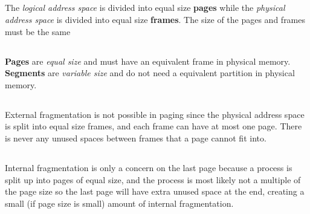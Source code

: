 \documentclass[11pt,letterpaper]{article}
\begin{document}
		\subsection{}
			\paragraph{}
			{
				The \textit{logical address space} is divided into equal size \textbf{pages} while the \textit{physical address space} is divided into equal size \textbf{frames}. The size of the pages and frames must be the same
			}
		\subsection{}
			\paragraph{}
			{
				\textbf{Pages} are \textit{equal size} and must have an equivalent frame in physical memory. \textbf{Segments} are \textit{variable size} and do not need a equivalent partition in physical memory.
			}
		\subsection{}
			\paragraph{}
			{
				External fragmentation is not possible in paging since the physical address space is split into equal size frames, and each frame can have at most one page. There is never any unused spaces between frames that a page cannot fit into.
			}
		\subsection{}
			\paragraph{}
			{
				Internal fragmentation is only a concern on the last page because a process is split up into pages of equal size, and the process is most likely not a multiple of the page size so the last page will have extra unused space at the end, creating a small (if page size is small) amount of internal fragmentation.
			}
	\section{}
		\subsection{}
\end{document}
